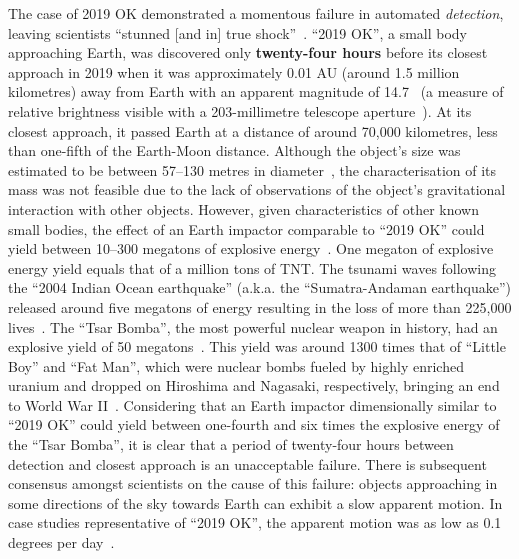 The case of 2019 OK demonstrated a momentous failure in automated \textit{detection}, leaving scientists ``stunned [and in] true shock''~\cite{chiu_2019}. ``2019 OK'', a small body approaching Earth, was discovered only \textbf{twenty-four hours} before its closest approach in 2019 when it was approximately 0.01 AU (around 1.5 million kilometres) away from Earth with an apparent magnitude of 14.7~\cite{IAU2019OK} (a measure of relative brightness visible with a 203-millimetre telescope aperture~\cite[p.~24]{North2014}). At its closest approach, it passed Earth at a distance of around 70,000 kilometres, less than one-fifth of the Earth-Moon distance. Although the object's size was estimated to be between 57--130 metres in diameter~\cite{NASA2019}, the characterisation of its mass was not feasible due to the lack of observations of the object's gravitational interaction with other objects. However, given characteristics of other known small bodies, the effect of an Earth impactor comparable to ``2019 OK'' could yield between 10--300 megatons of explosive energy~\cite{Cellino1999, Rumpf2017}. One megaton of explosive energy yield equals that of a million tons of \gls{TNT}. The tsunami waves following the ``2004 Indian Ocean earthquake'' (a.k.a. the ``Sumatra-Andaman earthquake'') released around five megatons of energy resulting in the loss of more than 225,000 lives~\cite{Nirupama2006}. The ``Tsar Bomba'', the most powerful nuclear weapon in history, had an explosive yield of 50 megatons~\cite{Khan2020}. This yield was around 1300 times that of ``Little Boy'' and ``Fat Man'', which were nuclear bombs fueled by highly enriched uranium and dropped on Hiroshima and Nagasaki, respectively, bringing an end to World War II~\cite{malik1985}. Considering that an Earth impactor dimensionally similar to ``2019 OK'' could yield between one-fourth and six times the explosive energy of the ``Tsar Bomba'', it is clear that a period of twenty-four hours between detection and closest approach is an unacceptable failure. There is subsequent consensus amongst scientists on the cause of this failure: objects approaching in some directions of the sky towards Earth can exhibit a slow apparent motion. In case studies representative of ``2019 OK'', the apparent motion was as low as 0.1 degrees per day~\cite{Wainscoat2022}. 

